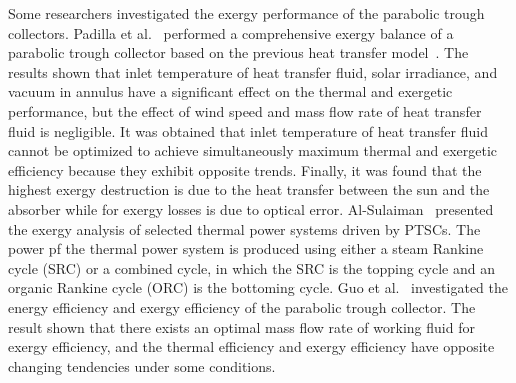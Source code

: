 Some researchers investigated the exergy performance of the parabolic trough collectors.
Padilla et al.~\cite{Padilla2014} performed a comprehensive exergy balance of a parabolic trough collector based on the previous heat transfer model~\cite{Padilla2011}. The results shown that inlet temperature of heat transfer fluid, solar irradiance, and vacuum in annulus have a significant effect on the thermal and exergetic performance, but the effect of wind speed and mass flow rate of heat transfer fluid is negligible. It was obtained that inlet temperature of heat transfer fluid cannot be optimized to achieve simultaneously maximum thermal and exergetic efficiency because they exhibit opposite trends. Finally, it was found that the highest exergy destruction is due to the heat transfer between the sun and the absorber while for exergy losses is due to optical error.
Al-Sulaiman~\cite{AlSulaiman2014} presented the exergy analysis of selected thermal power systems driven by PTSCs. The power pf the thermal power system is produced using either a steam Rankine cycle (SRC) or a combined cycle, in which the SRC is the topping cycle and an organic Rankine cycle (ORC) is the bottoming cycle.
Guo et al.~\cite{JiangfengGuo2016-1} investigated the energy efficiency and exergy efficiency of the parabolic trough collector. The result shown that there exists an optimal mass flow rate of working fluid for exergy efficiency, and the thermal efficiency and exergy efficiency have opposite changing tendencies under some conditions.

